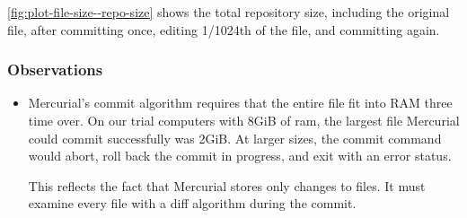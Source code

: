 \autoref{fig:plot-file-size--repo-size} shows the total
repository size, including the original file, after committing once, editing
1/1024th of the file, and committing again.

\iffalse

\subsubsection{Observations}

\begin{itemize}

  \item Mercurial's commit algorithm requires that the entire file fit into RAM
    three time over. On our trial computers with 8GiB of ram, the largest file
    Mercurial could commit successfully was 2GiB. At larger sizes, the commit
    command would abort, roll back the commit in progress, and exit with an
    error status.

    This reflects the fact that Mercurial stores only changes to files. It must
    examine every file with a diff algorithm during the commit.

\end{itemize}


